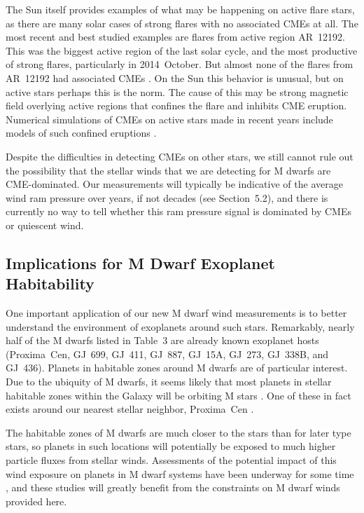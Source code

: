 \documentclass[preprint]{aastex}
\begin{document}
     The Sun itself provides examples of what may be happening on
active flare stars, as there are many solar cases of strong flares
with no associated CMEs at all.  The most recent and best studied
examples are flares from active region AR~12192.  This was the biggest
active region of the last solar cycle, and the most productive of
strong flares, particularly in 2014~October.  But almost none of
the flares from AR~12192 had associated CMEs \citep{xs15,jkt15}.
On the Sun this behavior is unusual, but on active stars perhaps this
is the norm.  The cause of this may be strong magnetic field overlying
active regions that confines the flare and inhibits CME eruption.
Numerical simulations of CMEs on active stars made in recent years
include models of such confined eruptions \citep{jdag18,jdag19a,jdag20b}.

     Despite the difficulties in detecting CMEs on other stars,
we still cannot rule out the possibility that the stellar
winds that we are detecting for M dwarfs are CME-dominated.
Our measurements will typically be indicative of the average wind ram
pressure over years, if not decades (see Section~5.2), and there is
currently no way to tell whether this ram pressure signal is
dominated by CMEs or quiescent wind.

\subsection{Implications for M Dwarf Exoplanet Habitability}

     One important application of our new M dwarf wind measurements
is to better understand the environment of exoplanets around such
stars.  Remarkably, nearly half of the M dwarfs listed in Table~3 are
already known exoplanet hosts (Proxima~Cen, GJ~699, GJ~411, GJ~887,
GJ~15A, GJ~273, GJ~338B, and GJ~436).  Planets in habitable zones around
M dwarfs are of particular interest.  Due to the ubiquity of M dwarfs,
it seems likely that most planets in stellar habitable zones within the
Galaxy will  be orbiting M stars \citep{cdd15}.  One
of these in fact exists around our nearest stellar neighbor, Proxima~Cen
\citep{gae16}.  

     The habitable zones of M dwarfs are much closer to the stars
than for later type stars, so planets in such locations will potentially
be exposed to much higher particle fluxes from stellar winds.
Assessments of the potential impact of this wind exposure on planets in
M dwarf systems have been underway for some
time \citep[e.g.,][]{aav13,cg16,cd17,jdag19b,jdag20a}, and
these studies will greatly benefit from the constraints on M dwarf
winds provided here.
\end{document}
